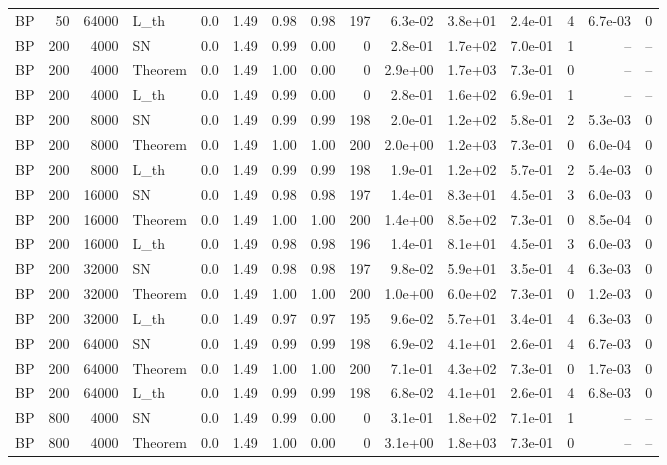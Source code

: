 \begin{tabular}{lrrlrrrrrrrrrrr}
BP & 50 & 64000 & L\_th & 0.0 & 1.49 & 0.98 & 0.98 & 197 & 6.3e-02 & 3.8e+01 & 2.4e-01 & 4 & 6.7e-03 & 0 \\
BP & 200 & 4000 & SN & 0.0 & 1.49 & 0.99 & 0.00 & 0 & 2.8e-01 & 1.7e+02 & 7.0e-01 & 1 & -- & -- \\
BP & 200 & 4000 & Theorem & 0.0 & 1.49 & 1.00 & 0.00 & 0 & 2.9e+00 & 1.7e+03 & 7.3e-01 & 0 & -- & -- \\
BP & 200 & 4000 & L\_th & 0.0 & 1.49 & 0.99 & 0.00 & 0 & 2.8e-01 & 1.6e+02 & 6.9e-01 & 1 & -- & -- \\
BP & 200 & 8000 & SN & 0.0 & 1.49 & 0.99 & 0.99 & 198 & 2.0e-01 & 1.2e+02 & 5.8e-01 & 2 & 5.3e-03 & 0 \\
BP & 200 & 8000 & Theorem & 0.0 & 1.49 & 1.00 & 1.00 & 200 & 2.0e+00 & 1.2e+03 & 7.3e-01 & 0 & 6.0e-04 & 0 \\
BP & 200 & 8000 & L\_th & 0.0 & 1.49 & 0.99 & 0.99 & 198 & 1.9e-01 & 1.2e+02 & 5.7e-01 & 2 & 5.4e-03 & 0 \\
BP & 200 & 16000 & SN & 0.0 & 1.49 & 0.98 & 0.98 & 197 & 1.4e-01 & 8.3e+01 & 4.5e-01 & 3 & 6.0e-03 & 0 \\
BP & 200 & 16000 & Theorem & 0.0 & 1.49 & 1.00 & 1.00 & 200 & 1.4e+00 & 8.5e+02 & 7.3e-01 & 0 & 8.5e-04 & 0 \\
BP & 200 & 16000 & L\_th & 0.0 & 1.49 & 0.98 & 0.98 & 196 & 1.4e-01 & 8.1e+01 & 4.5e-01 & 3 & 6.0e-03 & 0 \\
BP & 200 & 32000 & SN & 0.0 & 1.49 & 0.98 & 0.98 & 197 & 9.8e-02 & 5.9e+01 & 3.5e-01 & 4 & 6.3e-03 & 0 \\
BP & 200 & 32000 & Theorem & 0.0 & 1.49 & 1.00 & 1.00 & 200 & 1.0e+00 & 6.0e+02 & 7.3e-01 & 0 & 1.2e-03 & 0 \\
BP & 200 & 32000 & L\_th & 0.0 & 1.49 & 0.97 & 0.97 & 195 & 9.6e-02 & 5.7e+01 & 3.4e-01 & 4 & 6.3e-03 & 0 \\
BP & 200 & 64000 & SN & 0.0 & 1.49 & 0.99 & 0.99 & 198 & 6.9e-02 & 4.1e+01 & 2.6e-01 & 4 & 6.7e-03 & 0 \\
BP & 200 & 64000 & Theorem & 0.0 & 1.49 & 1.00 & 1.00 & 200 & 7.1e-01 & 4.3e+02 & 7.3e-01 & 0 & 1.7e-03 & 0 \\
BP & 200 & 64000 & L\_th & 0.0 & 1.49 & 0.99 & 0.99 & 198 & 6.8e-02 & 4.1e+01 & 2.6e-01 & 4 & 6.8e-03 & 0 \\
BP & 800 & 4000 & SN & 0.0 & 1.49 & 0.99 & 0.00 & 0 & 3.1e-01 & 1.8e+02 & 7.1e-01 & 1 & -- & -- \\
BP & 800 & 4000 & Theorem & 0.0 & 1.49 & 1.00 & 0.00 & 0 & 3.1e+00 & 1.8e+03 & 7.3e-01 & 0 & -- & -- \\

\end{tabular}
